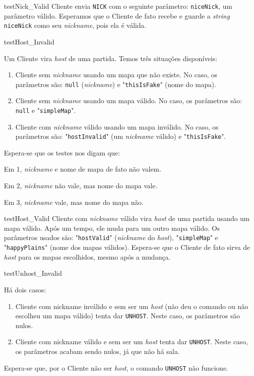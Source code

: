 \begin{itemise}
\teste
    {testNick\_Valid}
    {Cliente envia \texttt{NICK} com o seguinte parâmetro: \texttt{niceNick}, um
    parâmetro válido.}
    {Esperamos que o Cliente de fato recebe e guarde a \emph{string}
    \texttt{niceNick} como seu \emph{nickname}, pois ela é válida.}


\teste
    {testHost\_Invalid}
    {Um Cliente vira \emph{host} de uma partida. Temos três situações disponíveis:
        \begin{enumerate}
            \item Cliente sem \emph{nickname} usando um mapa que não existe. No caso,
                os parâmetros são: \texttt{null} (\emph{nickname}) e
            "\texttt{thisIsFake}" (nome do mapa).
            \item Cliente sem \emph{nickname} usando um mapa válido. No caso, os
                parâmetros são: \texttt{null} e "\texttt{simpleMap}".
            \item Cliente com \emph{nickname} válido usando um mapa inválido. No
                caso, os parâmetros são: "\texttt{hostInvalid}" (um \emph{nickname}
                válido) e "\texttt{thisIsFake}".
        \end{enumerate}
    }
    {Espera-se que os testes nos digam que:
        \begin{itemise}
            \item Em 1, \emph{nickname} e nome de mapa de fato não valem.
            \item Em 2, \emph{nickname} não vale, mas nome do mapa vale.
            \item Em 3, \emph{nickname} vale, mas nome do mapa não.
        \end{itemise}
    }
    
\teste
    {testHost\_Valid}
    {Cliente com \emph{nickname} válido vira \emph{host} de uma partida usando um
    mapa válido. Após um tempo, ele muda para um outro mapa válido. Os parâmetros
    usados são: "\texttt{hostValid}" (\emph{nickname} do \emph{host}),
    "\texttt{simpleMap}" e "\texttt{happyPlains}" (nome dos mapas válidos).}
    {Espera-se que o Cliente de fato sirva de \emph{host} para os mapas escolhidos,
    mesmo após a mudança.}

\teste
    {testUnhost\_Invalid}
    {Há dois casos:
        \begin{enumerate}
            \item Cliente com nickname inválido e sem ser um \emph{host} (não deu o
            comando ou não escolheu um mapa válido) tenta dar \texttt{UNHOST}.
            Neste caso, os parâmetros são nulos.
            \item Cliente com nickname válido e sem ser um \emph{host} tenta dar
            \texttt{UNHOST}. Neste caso, os parâmetros acabam sendo nulos, já que
            não há sala.
        \end{enumerate}
    }
    {Espera-se que, por o Cliente não ser \emph{host}, o comando \texttt{UNHOST} não
    funcione.}


\end{itemise}
